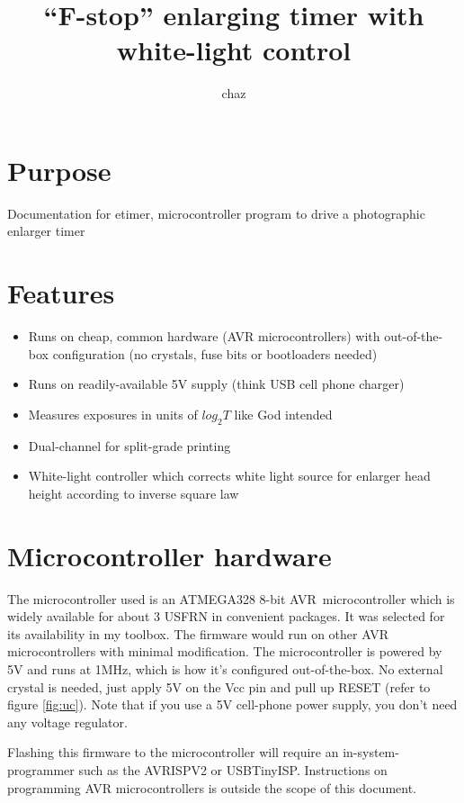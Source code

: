 \documentclass[dvips,12pt]{article}
\title{``F-stop'' enlarging timer with white-light control}
\author{chaz}
\begin{document}
\frenchspacing


\section{Purpose}
Documentation for etimer, microcontroller program to drive a photographic enlarger timer

\tableofcontents
\listoffigures

\newpage
\section{Features}
\begin{itemize}

\item Runs on cheap, common hardware (AVR microcontrollers) with out-of-the-box configuration
(no crystals, fuse bits or bootloaders needed)
\item Runs on readily-available 5V supply (think USB cell phone charger)
\item Measures exposures in units of $log_{2}T$ like God intended
\item Dual-channel for split-grade printing
\item White-light controller which corrects white light source for enlarger head height
according to inverse square law


\end{itemize}


\section{Microcontroller hardware}

The microcontroller used is an ATMEGA328 8-bit AVR\textcopyright\ microcontroller which is widely available for about 3 USFRN in convenient packages. It was selected for its availability in my toolbox. The firmware would run on other AVR microcontrollers with minimal modification. The microcontroller is powered by 5V and runs at 1MHz, which is how it's configured out-of-the-box.  No external crystal is needed, just apply 5V on the Vcc pin and pull up RESET (refer to figure \ref{fig:uc}). Note that if you use a 5V cell-phone power supply, you don't need any voltage regulator.

Flashing this firmware to the microcontroller will require an in-system-programmer such as the AVRISPV2 or USBTinyISP.  Instructions on programming AVR microcontrollers is outside the scope of this document. 
\end{document}
